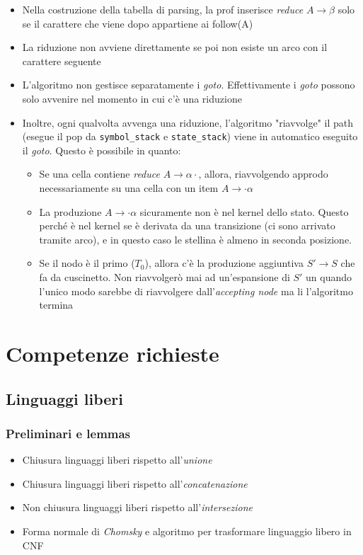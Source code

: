 \begin{itemize}
	\item Nella costruzione della tabella di parsing, la prof inserisce \textit{reduce} $ A \rightarrow \beta $ solo se il carattere che viene dopo appartiene ai follow(A)
	\item La riduzione non avviene direttamente se poi non esiste un arco con il carattere seguente
	\item L'algoritmo non gestisce separatamente i \textit{goto}. Effettivamente i \textit{goto} possono solo avvenire nel momento in cui c'è una riduzione
	\item Inoltre, ogni qualvolta avvenga una riduzione, l'algoritmo "riavvolge" il path (esegue il pop da \verb|symbol_stack| e \verb|state_stack|) viene in automatico eseguito il \textit{goto}. Questo è possibile in quanto:
	      \begin{itemize}
		      \item Se una cella contiene \textit{reduce} $ A \rightarrow \alpha \cdot  $, allora, riavvolgendo approdo necessariamente su una cella con un item $ A \rightarrow \cdot \alpha $
		      \item La produzione $ A \rightarrow \cdot \alpha $ sicuramente non è nel kernel dello stato. Questo perché è nel kernel se è derivata da una transizione (ci sono arrivato tramite arco), e in questo caso le stellina è almeno in seconda posizione.
		      \item Se il nodo è il primo ($ T_0 $), allora c'è la produzione aggiuntiva $ S' \rightarrow S $ che fa da cuscinetto. Non riavvolgerò mai ad un'espansione di $ S' $ un quando l'unico modo sarebbe di riavvolgere dall'\textit{accepting node} ma li l'algoritmo termina
	      \end{itemize}
\end{itemize}

\section{Competenze richieste}
\subsection{Linguaggi liberi}
\subsubsection{Preliminari e lemmas}
\begin{itemize}
	\item Chiusura linguaggi liberi rispetto all'\textit{unione}
	\item Chiusura linguaggi liberi rispetto all'\textit{concatenazione}
	\item Non chiusura linguaggi liberi rispetto all'\textit{intersezione}
	\item Forma normale di \textit{Chomsky} e algoritmo per trasformare linguaggio libero in CNF
\end{itemize}


